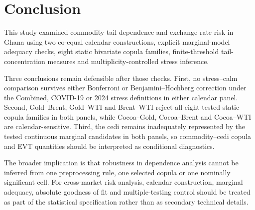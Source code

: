 \section{Conclusion}
\label{sec:conclusion}

This study examined commodity tail dependence and exchange-rate risk in Ghana using two co-equal calendar constructions, explicit marginal-model adequacy checks, eight static bivariate copula families, finite-threshold tail-concentration measures and multiplicity-controlled stress inference.

Three conclusions remain defensible after those checks. First, no stress--calm comparison survives either Bonferroni or Benjamini--Hochberg correction under the Combined, COVID-19 or 2024 stress definitions in either calendar panel. Second, Gold--Brent, Gold--WTI and Brent--WTI reject all eight tested static copula families in both panels, while Cocoa--Gold, Cocoa--Brent and Cocoa--WTI are calendar-sensitive. Third, the cedi remains inadequately represented by the tested continuous marginal candidates in both panels, so commodity--cedi copula and EVT quantities should be interpreted as conditional diagnostics.

The broader implication is that robustness in dependence analysis cannot be inferred from one preprocessing rule, one selected copula or one nominally significant cell. For cross-market risk analysis, calendar construction, marginal adequacy, absolute goodness of fit and multiple-testing control should be treated as part of the statistical specification rather than as secondary technical details.
